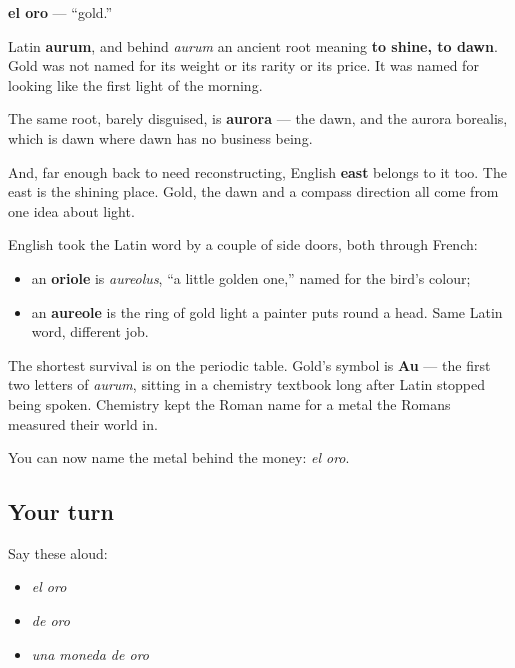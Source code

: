 \begin{cousinweb}
\textbf{el oro} — \textquotedblleft{}gold.\textquotedblright{}

Latin \textbf{aurum}, and behind \emph{aurum} an ancient root meaning \textbf{to shine, to dawn}. Gold was not named for its weight or its rarity or its price. It was named for looking like the first light of the morning.

The same root, barely disguised, is \textbf{aurora} — the dawn, and the aurora borealis, which is dawn where dawn has no business being.

And, far enough back to need reconstructing, English \textbf{east} belongs to it too. The east is the shining place. Gold, the dawn and a compass direction all come from one idea about light.

English took the Latin word by a couple of side doors, both through French:

\begin{itemize}
\raggedright
  \item an \textbf{oriole} is \emph{aureolus}, \textquotedblleft{}a little golden one,\textquotedblright{} named for the bird's colour;
  \item an \textbf{aureole} is the ring of gold light a painter puts round a head. Same Latin word, different job.
\end{itemize}

The shortest survival is on the periodic table. Gold's symbol is \textbf{Au} — the first two letters of \emph{aurum}, sitting in a chemistry textbook long after Latin stopped being spoken. Chemistry kept the Roman name for a metal the Romans measured their world in.
\end{cousinweb}

\begin{grammarlens}[title={What you've built}]
You can now name the metal behind the money: \emph{el oro}.
\end{grammarlens}

\subsection*{Your turn}
Say these aloud:

\begin{itemize}
\raggedright
  \item \emph{el oro}
  \item \emph{de oro}
  \item \emph{una moneda de oro}
\end{itemize}

